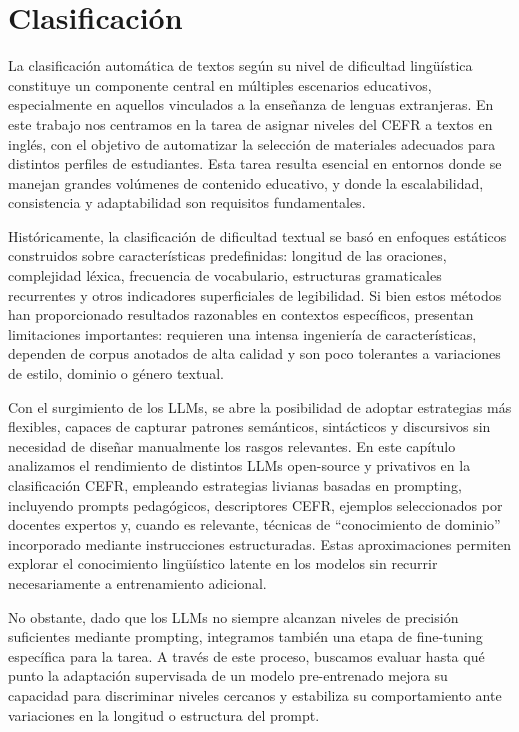 \section{Clasificación}%
La clasificación automática de textos según su nivel de dificultad lingüística constituye un componente central en múltiples escenarios educativos, especialmente en aquellos vinculados a la enseñanza de lenguas extranjeras. En este trabajo nos centramos en la tarea de asignar niveles del CEFR a textos en inglés, con el objetivo de automatizar la selección de materiales adecuados para distintos perfiles de estudiantes. Esta tarea resulta esencial en entornos donde se manejan grandes volúmenes de contenido educativo, y donde la escalabilidad, consistencia y adaptabilidad son requisitos fundamentales.

Históricamente, la clasificación de dificultad textual se basó en enfoques estáticos construidos sobre características predefinidas: longitud de las oraciones, complejidad léxica, frecuencia de vocabulario, estructuras gramaticales recurrentes y otros indicadores superficiales de legibilidad. Si bien estos métodos han proporcionado resultados razonables en contextos específicos, presentan limitaciones importantes: requieren una intensa ingeniería de características, dependen de corpus anotados de alta calidad y son poco tolerantes a variaciones de estilo, dominio o género textual.

Con el surgimiento de los LLMs, se abre la posibilidad de adoptar estrategias más flexibles, capaces de capturar patrones semánticos, sintácticos y discursivos sin necesidad de diseñar manualmente los rasgos relevantes. En este capítulo analizamos el rendimiento de distintos LLMs open-source y privativos en la clasificación CEFR, empleando estrategias livianas basadas en prompting, incluyendo prompts pedagógicos, descriptores CEFR, ejemplos seleccionados por docentes expertos y, cuando es relevante, técnicas de “conocimiento de dominio” incorporado mediante instrucciones estructuradas. Estas aproximaciones permiten explorar el conocimiento lingüístico latente en los modelos sin recurrir necesariamente a entrenamiento adicional.

No obstante, dado que los LLMs no siempre alcanzan niveles de precisión suficientes mediante prompting, integramos también una etapa de fine-tuning específica para la tarea. A través de este proceso, buscamos evaluar hasta qué punto la adaptación supervisada de un modelo pre-entrenado mejora su capacidad para discriminar niveles cercanos y estabiliza su comportamiento ante variaciones en la longitud o estructura del prompt.

